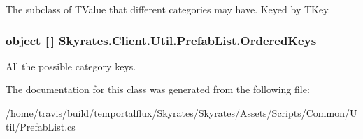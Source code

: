 The subclass of T\-Value that different categories may have. Keyed by T\-Key. 

\hypertarget{class_skyrates_1_1_client_1_1_util_1_1_prefab_list_a287ed0c2748a27d810901e9edaef2762}{
\subsubsection[{Ordered\-Keys}]{\setlength{\rightskip}{0pt plus 5cm}object \mbox{[}$\,$\mbox{]} Skyrates.\-Client.\-Util.\-Prefab\-List.\-Ordered\-Keys}}\label{class_skyrates_1_1_client_1_1_util_1_1_prefab_list_a287ed0c2748a27d810901e9edaef2762}


All the possible category keys. 



The documentation for this class was generated from the following file\-:\begin{DoxyCompactItemize}
\item 
/home/travis/build/temportalflux/\-Skyrates/\-Skyrates/\-Assets/\-Scripts/\-Common/\-Util/Prefab\-List.\-cs\end{DoxyCompactItemize}
